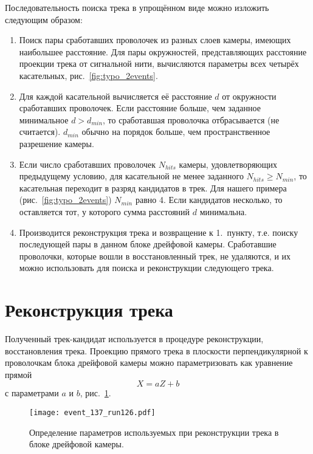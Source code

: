 Последовательность поиска трека в упрощённом виде можно изложить следующим
образом:
\begin{enumerate}
\item Поиск пары сработавших проволочек из разных слоев камеры, имеющих
  наибольшее расстояние. Для пары окружностей, представляющих расстояние
  проекции трека от сигнальной нити, вычисляются параметры всех четырёх
  касательных, рис.~\ref{fig:typo_2events}.
\item Для каждой касательной вычисляется её расстояние $d$ от окружности
  сработавших проволочек. Если расстояние больше, чем заданное минимальное
  $d > d_{min}$, то сработавшая проволочка отбрасывается (не считается).
  $d_{min}$ обычно на порядок больше, чем пространственное разрешение камеры.
\item Если число сработавших проволочек $N_{hits}$ камеры, удовлетворяющих
  предыдущему условию, для касательной не менее заданного
  $N_{hits} \geq  N_{min}$, то касательная переходит в разряд кандидатов в трек.
  Для нашего примера (рис.~\ref{fig:typo_2events}) $N_{min}$ равно 4. Если
  кандидатов несколько, то оставляется тот, у которого сумма расстояний $d$
  минимальна.
\item Производится реконструкция трека и возвращение к 1.~пункту, т.е. поиску
  последующей пары в данном блоке дрейфовой камеры. Сработавшие проволочки,
  которые вошли  в восстановленный трек, не удаляются, и их можно использовать
  для поиска и реконструкции следующего трека.
\end{enumerate}

\section{Реконструкция трека}
Полученный трек-кандидат используется в процедуре реконструкции, восстановления
трека. Проекцию прямого трека в плоскости перпендикулярной к проволочкам блока
дрейфовой камеры можно параметризовать как уравнение прямой
\begin{equation}
  X = aZ + b
\end{equation}
с параметрами $a$ и $b$, рис.~\ref{fig:reco_scheme}.

\begin{figure}[h]
  \centering
  \texttt{[image: event\_137\_run126.pdf]}
  \caption{Определение параметров используемых при реконструкции трека в
    блоке дрейфовой камеры.}
  \label{fig:reco_scheme}
\end{figure}

